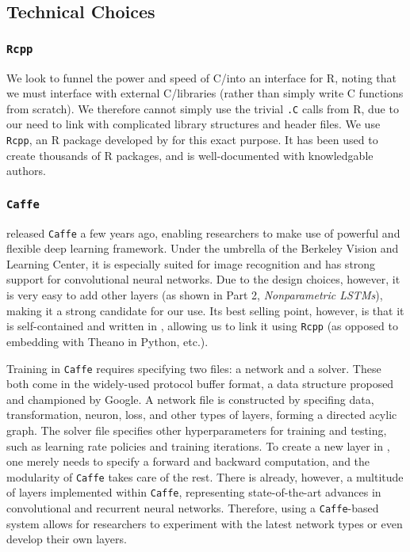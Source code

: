 \documentclass[master]{subfiles}
\begin{document}
\subsection{Technical Choices}
\subsubsection{\lstinline{Rcpp}}
We look to funnel the power and speed of C/\CPP into an interface for R, noting that we must interface with external C/\CPP libraries (rather than simply write C functions from scratch).  We therefore cannot simply use the trivial \lstinline{.C} calls from R, due to our need to link with complicated library structures and header files.  We use \lstinline{Rcpp}, an R package developed by \cite{rcpp} for this exact purpose.  It has been used to create thousands of R packages, and is well-documented with knowledgable authors.
\subsubsection{\lstinline{Caffe}}
\cite{jia2014caffe} released \lstinline{Caffe} a few years ago, enabling researchers to make use of powerful and flexible deep learning framework.  Under the umbrella of the Berkeley Vision and Learning Center, it is especially suited for image recognition and has strong support for convolutional neural networks.  Due to the design choices, however, it is very easy to add other layers (as shown in Part 2, \textit{Nonparametric LSTMs}), making it a strong candidate for our use.  Its best selling point, however, is that it is self-contained and written in \CPP, allowing us to link it using \lstinline{Rcpp} (as opposed to embedding with Theano in Python, etc.).\par
Training in \lstinline{Caffe} requires specifying two files: a network and a solver.  These both come in the widely-used protocol buffer format, a data structure proposed and championed by Google.  A network file is constructed by specifing data, transformation, neuron, loss, and other types of layers, forming a directed acylic graph.  The solver file specifies other hyperparameters for training and testing, such as learning rate policies and training iterations.  To create a new layer in \CPP, one merely needs to specify a forward and backward computation, and the modularity of \lstinline{Caffe} takes care of the rest.  There is already, however, a multitude of layers implemented within \lstinline{Caffe}, representing state-of-the-art advances in convolutional and recurrent neural networks.  Therefore, using a \lstinline{Caffe}-based system allows for researchers to experiment with the latest network types or even develop their own layers.
\end{document}
